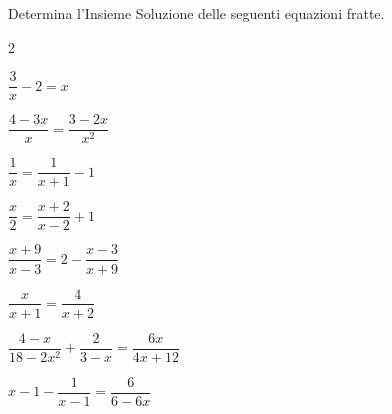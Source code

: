 \begin{esercizio}[*]
\label{ese:3.39}
Determina l'Insieme Soluzione delle seguenti equazioni fratte.
\begin{htmulticols}{2}
\begin{enumeratea}
\item \(\dfrac{3}{x}-2 = x\)
\item \(\dfrac{4-3 x}{x}=\dfrac{3-2 x}{x^{2}}\)
\item \(\dfrac{1}{x} = \dfrac{1}{x + 1}-1\)
\sol{\emptyset}
\item \(\dfrac{x}{2} = \dfrac{x + 2}{x-2} + 1\)
\item \(\dfrac{x + 9}{x-3}=2-\dfrac{x-3}{x + 9}\)
\sol{\emptyset}
\item \(\dfrac{x}{x + 1} = \dfrac{4}{x + 2}\)
\item \(\dfrac{4-x}{18-2 x^{2}} + \dfrac{2}{3-x} = \dfrac{6 x}{4 x +12}\)
\sol{\emptyset}
\item \(x-1-\dfrac{1}{x-1} = \dfrac{6}{6-6 x}\)
\sol{\emptyset}
\end{enumeratea}
\end{htmulticols}
\end{esercizio}


